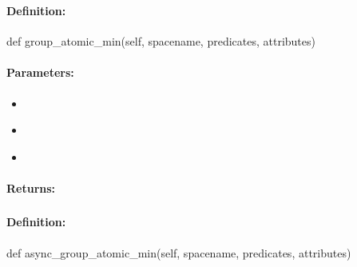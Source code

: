 \pagebreak
\subsubsection{}
\label{api:python:group_atomic_min}


\paragraph{Definition:}
\begin{pythoncode}
def group_atomic_min(self, spacename, predicates, attributes)
\end{pythoncode}

\paragraph{Parameters:}
\begin{itemize}[noitemsep]
\item {}\\

\item {}\\

\item {}\\

\end{itemize}

\paragraph{Returns:}


\pagebreak
\subsubsection{}
\label{api:python:async_group_atomic_min}


\paragraph{Definition:}
\begin{pythoncode}
def async_group_atomic_min(self, spacename, predicates, attributes)
\end{pythoncode}


